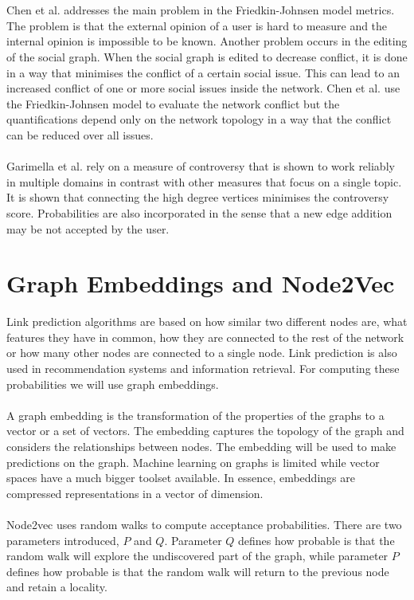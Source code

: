 \\
\\
Chen et al. \cite{chen} addresses the main problem in the Friedkin-Johnsen model metrics. The problem is that the external opinion of a user is hard to measure and the internal opinion is impossible to be known. Another problem occurs in the editing of the social graph. When the social graph is edited to decrease conflict, it is done in a way that minimises the conflict of a certain social issue. This can lead to an increased conflict of one or more social issues inside the network. Chen et al. \cite{chen} use the Friedkin-Johnsen model to evaluate the network conflict but the quantifications depend only on the network topology in a way that the conflict can be reduced over all issues. 
\\
\\
Garimella et al. \cite{garimella} rely on a measure of controversy that is shown to work reliably in multiple domains in contrast with other measures that focus on a single topic. It is shown that connecting the high degree vertices minimises the controversy score. Probabilities are also incorporated in the sense that a new edge addition may be not accepted by the user.

\section{Graph Embeddings and Node2Vec}		
\label{sec:embeddings}

Link prediction algorithms are based on how similar two different nodes are, what features they have in common, how they are connected to the rest of the network or how many other nodes are connected to a single node. Link prediction is also used in recommendation systems and  information retrieval. For computing these probabilities we will use graph embeddings.		
\\
\\
A graph embedding \cite{Leskovec} is the transformation of the properties of the graphs to a vector or a set of vectors. The embedding captures the topology of the graph and considers the relationships between nodes. The embedding will be used to make predictions on the graph. Machine learning on graphs is limited while vector spaces have a much bigger toolset available. In essence, embeddings are compressed representations in a vector of dimension.		
\\
\\
Node2vec uses random walks to compute acceptance probabilities. There are two parameters introduced, $P$ and $Q$. Parameter $Q$ defines how probable is that the random walk will explore the undiscovered part of the graph, while parameter $P$ defines how probable is that the random walk will return to the previous node and retain a locality.
